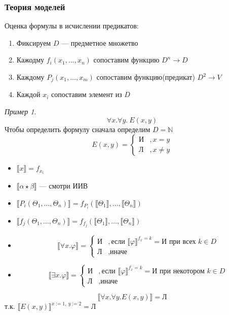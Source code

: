 \documentclass[english]{article}
\newcommand{\N}{\mathbb{N}}
\theoremstyle{plain}
\theoremstyle{remark}
\newtheorem*{examp}{Пример}
\theoremstyle{definition}
\begin{document}
\subsubsection{Теория моделей}
\label{sec:orgfb67de5}
Оценка формулы в исчислении предикатов:
\begin{enumerate}
\item Фиксируем \(D\) --- предметное множетво
\item Кажодму \(f_i(x_1, \dots, x_n)\) сопоставим функцию \(D^n \to D\)
\item Каждому \(P_j(x_1, \dots, x_m)\) сопоставим функцию(предикат) \(D^2 \to V\)
\item Каждой \(x_i\) сопоставим элемент из \(D\)
\end{enumerate}
\begin{examp}
\[\forall x.\forall y.\ E(x, y)\]
Чтобы определить формулу сначала определим \(D = \N\) 
\[ E(x, y) = \begin{cases}\text{И} & ,x = y \\ \text{Л} &, x\neq y\end{cases} \]
\begin{itemize}
\item \(\llbracket x \rrbracket = f_{x_i}\)
\item \(\llbracket \alpha \star \beta \rrbracket\) --- смотри ИИВ
\item \(\llbracket P_i(\Theta_1, \dots , \Theta_n) \rrbracket = f_{P_i}(\llbracket \Theta_1 \rrbracket, \dots, \llbracket \Theta_n \rrbracket)\)
\item \(\llbracket f_j(\Theta_1 , \dots, \Theta_n ) \rrbracket = f_{f_j}(\llbracket \Theta_1 \rrbracket, \dots, \llbracket \Theta_n \rrbracket)\)
\item \[ \llbracket \forall x. \varphi \rrbracket = \begin{cases} \text{И} & , \text{если } \llbracket \varphi \rrbracket^{f_x = k} = \text{И}\text{ при всех } k \in D  \\ \text{Л} &,\text{иначе}\end{cases} \]
\item \[ \llbracket \exists x.\varphi \rrbracket = \begin{cases} \text{И} &, \text{если } \llbracket \varphi \rrbracket^{f_x = k} = \text{И при некотором } k \in D \\ \text{Л} &,\text{иначе} \end{cases} \]
\end{itemize}
\[ \llbracket \forall x.\forall y.E(x, y) \rrbracket = \text{Л} \]
т.к. \(\llbracket E(x, y) \rrbracket^{x:=1,\ y:=2} = \text{Л}\)
\end{examp}
\newcommand{\colorboxed}[2]{\,\color{#1}\fbox{\color{black}#2}\color{black}\,}
\end{document}
